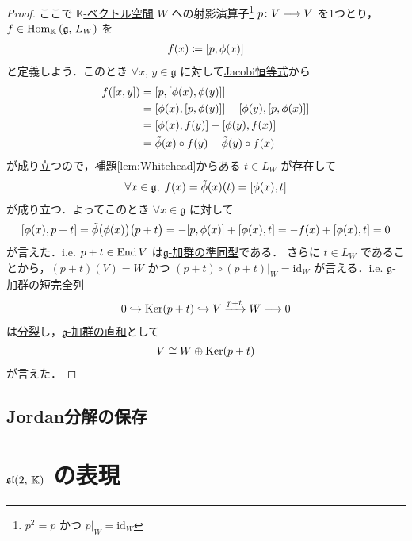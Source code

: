 \documentclass[rep_main]{subfiles}
\begin{document}
\begin{proof}
	ここで \underline{$\mathbb{K}$-ベクトル空間} $W$ への射影演算子\footnote{$p^2 = p$ かつ $p|_W = \mathrm{id}_W$} $p \colon V \longrightarrow V$ を1つとり，$f \in \mathrm{Hom}_{\mathbb{K}} \mathop{}(\mathfrak{g},\, L_W)$ を
	\begin{align}
		f(x) \coloneqq \comm{p}{\phi(x)}
	\end{align}
	と定義しよう．このとき $\forall x,\, y \in \mathfrak{g}$ に対して\hyperref[ax:LieAlg]{Jacobi恒等式}から
	\begin{align}
		f(\comm{x}{y})
		&= \comm{p}{\comm{\phi(x)}{\phi(y)}} \\
		&= \comm{\phi(x)}{\comm{p}{\phi(y)}} - \comm{\phi(y)}{\comm{p}{\phi(x)}} \\
		&= \comm{\phi(x)}{f(y)} - \comm{\phi(y)}{f(x)} \\
		&= \tilde{\phi}(x) \circ f(y) - \tilde{\phi}(y) \circ f(x)
	\end{align}
	が成り立つので，補題\ref{lem:Whitehead}からある $t \in L_W$ が存在して
	\begin{align}
		\forall x \in \mathfrak{g},\; f(x) = \tilde{\phi}(x)(t) = \comm{\phi(x)}{t}
	\end{align}
	が成り立つ．よってこのとき $\forall x \in \mathfrak{g}$ に対して
	\begin{align}
		\comm{\phi(x)}{p+t} = \tilde{\phi}\bigl(\phi(x)\bigr)\bigl( p+t \bigr) = - \comm{p}{\phi(x)} + \comm{\phi(x)}{t} = -f(x) + \comm{\phi(x)}{t} = 0
	\end{align}
	が言えた．i.e. $p+t \in \operatorname{End} V$ は\hyperref[def:g-module-hom]{$\mathfrak{g}$-加群の準同型}である．
	さらに $t \in L_W$ であることから，$(p+t)(V) = W$ かつ $(p+t) \circ (p+t)|_W = \mathrm{id}_W$ が言える．i.e. $\mathfrak{g}$-加群の短完全列
	\begin{align}
		0 \hookrightarrow \operatorname{Ker} (p+t) \hookrightarrow V \xrightarrow{p+t} W \longrightarrow 0
	\end{align}
	は\hyperref[prop:split]{分裂}し，\hyperref[def:gmod-directsum]{$\mathfrak{g}$-加群の直和}として
	\begin{align}
		V \cong W \oplus \operatorname{Ker} (p+t)
	\end{align}
	が言えた．
\end{proof}



\subsection{Jordan分解の保存}

\section{$\mathfrak{sl}(2,\, \mathbb{K})$ の表現}
\end{document}
